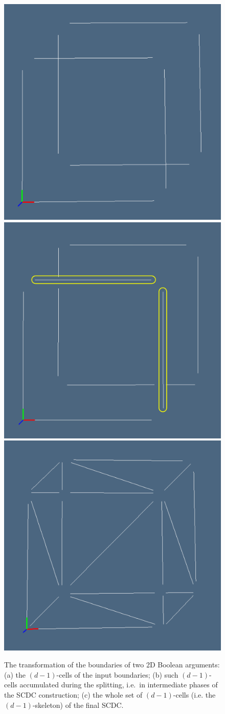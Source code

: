 \documentclass[11pt,oneside]{article}	%
\begin{document}
\begin{figure}[htbp] %
   \centering
   \includegraphics[height=0.325\linewidth,width=0.325\linewidth]{images/boundaryFacets1} 
   \includegraphics[height=0.325\linewidth,width=0.325\linewidth]{images/boundaryFacets2} 
   \includegraphics[height=0.325\linewidth,width=0.325\linewidth]{images/boundaryFacets3} 
   \caption{The transformation of the boundaries of two 2D Boolean arguments: (a) the $(d-1)$-cells of the input boundaries; (b) such $(d-1)$-cells accumulated during the splitting, i.e.~in intermediate phases of the SCDC construction; (c) the whole set of $(d-1)$-cells (i.e. the $(d-1)$-skeleton) of the final SCDC.}
   \label{fig:boundaryFacets}
\end{figure}
\end{document}
